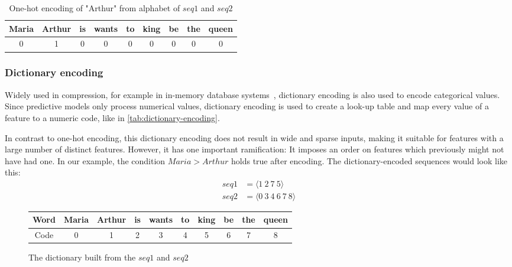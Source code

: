 \begin{table}[ht]
    \centering
    \begin{tabular}{c|c|c|c|c|c|c|c|c}
        Maria & Arthur & is & wants & to & king & be & the & queen\\
        \hline
        0 & 1 & 0 & 0 & 0 & 0 & 0 & 0 & 0\\
    \end{tabular}
    \caption{One-hot encoding of "Arthur" from alphabet of $seq1$ and $seq2$}
    \label{tab:one-hot}
\end{table}

\subsubsection*{Dictionary encoding}
Widely used in compression, for example in in-memory database systems~\cite{plattner2012memory}, dictionary encoding is also used to encode categorical values. Since predictive models only process numerical values, dictionary encoding is used to create a look-up table and map every value of a feature to a numeric code, like in \autoref{tab:dictionary-encoding}.

In contrast to one-hot encoding, this dictionary encoding does not result in wide and sparse inputs, making it suitable for features with a large number of distinct features. However, it has one important ramification: It imposes an order on features which previously might not have had one. In our example, the condition $Maria > Arthur$ holds true after encoding. The dictionary-encoded sequences would look like this:
\begin{equation*}
    \begin{split}
        seq1 &= \langle1\ 2\ 7\ 5\rangle\\
        seq2 &= \langle0\ 3\ 4\ 6\ 7\ 8\rangle
    \end{split}
\end{equation*}

\begin{figure}
    \centering
    \begin{tabular}{c|ccccccccc}
        Word & Maria & Arthur & is & wants & to & king & be & the & queen\\
        \hline
        Code & 0 & 1 & 2 & 3 & 4 & 5 & 6 & 7 & 8
    \end{tabular}
    \caption{The dictionary built from the $seq1$ and $seq2$}
    \label{tab:dictionary-encoding}
\end{figure}

